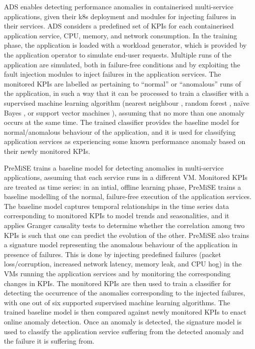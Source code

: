 ADS \cite{15_Du2018_AnomalyDetectionContainerMicroservices} enables detecting performance anomalies in containerised multi-service applications, given their k8s deployment and modules for injecting failures in their services.
ADS \cite{15_Du2018_AnomalyDetectionContainerMicroservices} considers a predefined set of KPIs for each containerised application service, \viz CPU, memory, and network consumption.
In the training phase, the application is loaded with a workload generator, which is provided by the application operator to simulate end-user requests. 
Multiple runs of the application are simulated, both in failure-free conditions and by exploiting the fault injection modules to inject failures in the application services. 
The monitored KPIs are labelled as pertaining to \enquote{normal} or \enquote{anomalous} runs of the application, in such a way that it can be processed to train a classifier with a supervised machine learning algorithm (\viz nearest neighbour \cite{Altman1992_NearestNeighbor}, random forest \cite{Breiman2001_RandomForests}, na\"ive Bayes \cite{John1995_NaiveBayes}, or support vector machines \cite{Scholkopf1999_SupportVectorLearning}), assuming that no more than one anomaly occurs at the same time.
The trained classifier provides the baseline model for normal/anomalous behaviour of the application, and it is used for classifying application services as experiencing some known performance anomaly based on their newly monitored KPIs.

PreMiSE \cite{33_Mariani2020_PredictingFailures} trains a baseline model for detecting anomalies in multi-service applications, assuming that each service runs in a different VM. 
Monitored KPIs are treated as time series: in an intial, offline learning phase, PreMiSE \cite{33_Mariani2020_PredictingFailures} trains a baseline modelling of the normal, failure-free execution of the application services. 
The baseline model captures temporal relationships in the time series data corresponding to monitored KPIs to model trends and seasonalities, and it applies Granger causality tests \cite{Arnold2007_GrangerMethodsTemporalCausalModelling} to determine whether the correlation among two KPIs is such that one can predict the evolution of the other.
PreMiSE \cite{33_Mariani2020_PredictingFailures} also trains a signature model representing the anomalous behaviour of the application in presence of failures.
This is done by injecting predefined failures (\viz packet loss/corruption, increased network latency, memory leak, and CPU hog) in the VMs running the application services and by monitoring the corresponding changes in KPIs.
The monitored KPIs are then used to train a classifier for detecting the occurrence of the anomalies corresponding to the injected failures, with one out of six supported supervised machine learning algorithms. 
The trained baseline model is then compared against newly monitored KPIs to enact online anomaly detection. 
Once an anomaly is detected, the signature model is used to classify the application service suffering from the detected anomaly and the failure it is suffering from. 

